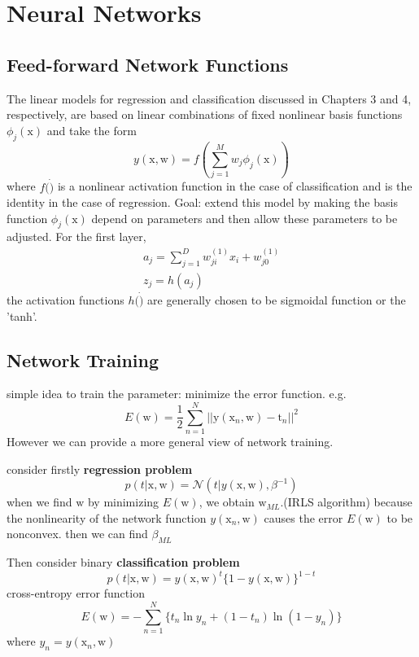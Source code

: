 \documentclass[a4paper]{book}
\begin{document}
\section{Neural Networks}
\subsection{Feed-forward Network Functions}
The linear models for regression and classification discussed in Chapters 3 and 4, respectively, are based on linear combinations of fixed nonlinear basis functions $\phi_j(\mathrm x)$ and take the form
\begin{equation}\label{eq3.4.1}
  y(\mathrm x,\mathrm w) = f(\sum_{j=1}^Mw_j\phi_j(\mathrm x))
\end{equation}
where $f(\dot)$ is a nonlinear activation function in the case of classification and is the identity in the case of regression.\newline
Goal: extend this model by making the basis function $\phi_j(\mathrm x)$ depend on parameters and then allow these parameters to be adjusted.\newline
For the first layer,
\begin{gather}\label{eq3.4.2}
a_j=\sum_{j=1}^Dw_{ji}^{(1)}x_i+w_{j0}^{(1)} \\
z_j=h(a_j)
\end{gather}
the activation functions $h(\dot)$  are generally chosen to be sigmoidal function or the 'tanh'.
\subsection{Network Training}
simple idea to train the parameter: minimize the error function. e.g.
\begin{equation}\label{eq3.4.3}
  E(\mathrm w) = \frac12\sum_{n=1}^N||\mathrm y(\mathrm x_n,\mathrm w)-\mathrm t_n||^2
\end{equation}
However we can provide a more general view of network training.

consider firstly \textbf{regression problem}
$$p(t|\mathrm x,\mathrm w) = \mathcal N(t|y(\mathrm x,\mathrm w),\beta^{-1})$$
when we find $\mathrm w$ by minimizing $E(\mathrm w)$, we obtain $\mathrm w_{ML}$.(IRLS algorithm) because the nonlinearity of the network function $y(\mathrm x_n,\mathrm w)$ causes the error $E(\mathrm w)$ to be nonconvex.  then we can find $\beta_{ML}$

Then consider binary \textbf{classification problem}
$$p(t|\mathrm  x,\mathrm w) = y(\mathrm  x,\mathrm  w)^t\{1-y(\mathrm  x,\mathrm  w)\}^{1-t}$$
cross-entropy error function
\begin{equation}\label{eq3.4.4}
E(\mathrm w) = -\sum_{n=1}^N\{t_n\ln y_n+(1-t_n)\ln(1-y_n)\}
\end{equation}
where $y_n = y(\mathrm x_n,\mathrm w)$
\end{document}
